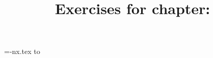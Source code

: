\documentclass{artikel3}
\newcounter{chapter}
\begin{document}
\begin{raggedright}

\title{Exercises for chapter: \chaptershorttitle}
\author{}\date{}\maketitle


\newread\nx
\openin\nx=\chaptername-nx.tex
\read\nx to \nex
\closein\nx

\begin{enumerate}
\repeat {} \to{\nex}
\end{enumerate}

\end{raggedright}
\end{document}
